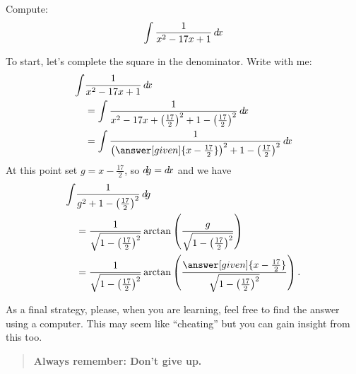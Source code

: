 \documentclass{ximera}
\begin{document}
\begin{example}
  Compute:
  \[
  \int \frac{1}{x^2-17x +1}\mathop{}\!d\! x
  \]
  \begin{explanation}
    To start, let's complete the square in the denominator. Write with me:
    \begin{align*}
      \int &\frac{1}{x^2-17x +1} \d x \\
      &=  \int \frac{1}{x^2-17x +\left(\frac{17}{2}\right)^2 + 1 - \left(\frac{17}{2}\right)^2} \d x\\
      &=  \int \frac{1}{\left(\answer[given]{x-\frac{17}{2}}\right)^2 + 1 - \left(\frac{17}{2}\right)^2} \d x
    \end{align*}
    At this point set $g= x-\frac{17}{2}$, so $\mathop{}\!d\! g = \mathop{}\!d\! x$ and we have
    \begin{align*}
    \int &\frac{1}{g^2 + 1 - \left(\frac{17}{2}\right)^2} \d g \\
    &= \frac{1}{\sqrt{1 - \left(\frac{17}{2}\right)^2}} \arctan\left(\frac{g}{\sqrt{1 - \left(\frac{17}{2}\right)^2}}\right)\\
    &= \frac{1}{\sqrt{1 - \left(\frac{17}{2}\right)^2}} \arctan\left(\frac{\answer[given]{x-\frac{17}{2}}}{\sqrt{1 - \left(\frac{17}{2}\right)^2}}\right).
    \end{align*}
  \end{explanation}
\end{example}

As a final strategy, please, when you are learning, feel free to find
the answer using a computer. This may seem like ``cheating'' but you
can gain insight from this too.
\begin{quote}
  \textbf{Always remember: Don't give up.}
\end{quote}
\end{document}
